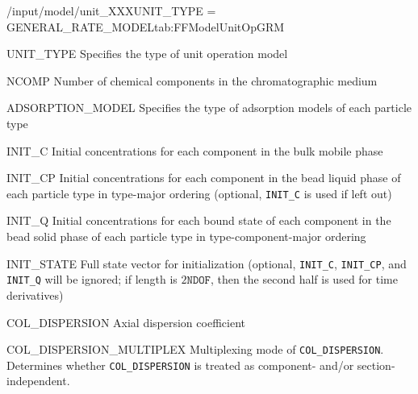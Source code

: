 \begin{condsubgroup}{/input/model/unit\_XXX}{UNIT\_TYPE = GENERAL\_RATE\_MODEL}{tab:FFModelUnitOpGRM}
  \begin{dataset}[type=string,range={\texttt{GENERAL\_RATE\_MODEL}},length=1]{UNIT\_TYPE}
    Specifies the type of unit operation model
  \end{dataset}
  \begin{dataset}[type=int,range={$\geq 1$},length=1]{NCOMP}
    Number of chemical components in the chromatographic medium
  \end{dataset}
  \begin{dataset}[type=string,range={See Section~\ref{sec:FFAdsorption}},length={\texttt{NPARTYPE}}]{ADSORPTION\_MODEL}
    Specifies the type of adsorption models of each particle type
  \end{dataset}
  \begin{dataset}[unit=\si{\mol\per\cubic\metre\of{IV}},type=double,range={$\geq 0$},length={\texttt{NCOMP}}]{INIT\_C}
    Initial concentrations for each component in the bulk mobile phase
  \end{dataset}
  \begin{dataset}[unit=\si{\mol\per\cubic\metre\of{MP}},type=double,range={$\geq 0$},length={$\texttt{NPARTYPE} \cdot \texttt{NCOMP}$}]{INIT\_CP}
    Initial concentrations for each component in the bead liquid phase of each particle type in type-major ordering (optional, \texttt{INIT\_C} is used if left out)
  \end{dataset}
  \begin{dataset}[unit=\si{\mol\per\cubic\metre\of{SP}},type=double,range={$\geq 0$},length={\texttt{NTOTALBND}}]{INIT\_Q}
    Initial concentrations for each bound state of each component in the bead solid phase of each particle type in type-component-major ordering
  \end{dataset}
  \begin{dataset}[unit=various,type=double,range={$\mathds{R}$},length={\texttt{NDOF} / $2\texttt{NDOF}$}]{INIT\_STATE}
    Full state vector for initialization (optional, \texttt{INIT\_C}, \texttt{INIT\_CP}, and \texttt{INIT\_Q} will be ignored; if length is $2\texttt{NDOF}$, then the second half is used for time derivatives)
  \end{dataset}
  \begin{dataset}[unit=\si{\square\metre\of{IV}\per\second},type=double,range={$\geq 0$},length={see \texttt{COL\_DISPERSION\_MULTIPLEX}}]{COL\_DISPERSION}
    Axial dispersion coefficient
  \end{dataset}
  \begin{dataset}[unit=--,type=int,range={$\{0, \dots, 3 \}$},length={1}]{COL\_DISPERSION\_MULTIPLEX}
    Multiplexing mode of \texttt{COL\_DISPERSION}.
    Determines whether \texttt{COL\_DISPERSION} is treated as component- and/or section-independent.


\end{dataset}
\end{condsubgroup}
